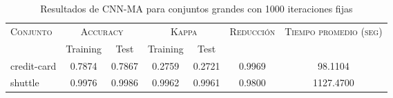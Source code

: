 \begin{table}[]
\centering
\begin{tabular}{l c c c c c c}
\hline
\multirow{2}{*}{\textsc{Conjunto}}
	& \multicolumn{2}{c}{\textsc{Accuracy}}
	& \multicolumn{2}{c}{\textsc{Kappa}}
	& \textsc{Reducción}
	& \textsc{Tiempo promedio (seg)} \\
	& Training & Test
	& Training & Test \\ 
\hline
\hline

credit-card & 0.7874 & 0.7867 & 0.2759 & 0.2721 & 0.9969 & 98.1104 \\
shuttle & 0.9976 & 0.9986 & 0.9962 & 0.9961 & 0.9800 & 1127.4700 \\

\hline
\end{tabular}
\caption{Resultados de CNN-MA para conjuntos grandes con 1000 iteraciones fijas}
\label{res-grande-CNN-MA}
\end{table}

